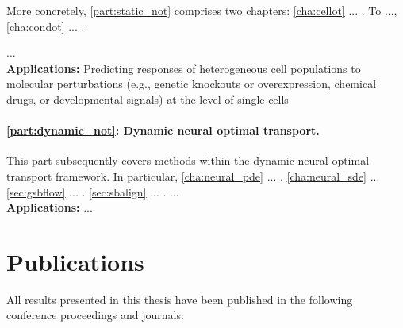 More concretely, \cref{part:static_not} comprises two chapters:
\cref{cha:cellot} ... \citep{bunne2021learning}. To ..., \cref{cha:condot} ... \citep{bunne2022supervised}.

... \\
	
\textbf{Applications:} Predicting responses of heterogeneous cell populations to molecular perturbations (e.g., genetic knockouts or overexpression, chemical drugs, or developmental signals) at the level of single cells


\paragraph{\cref{part:dynamic_not}: Dynamic neural optimal transport.}
This part subsequently covers methods within the dynamic neural optimal transport framework. In particular, \cref{cha:neural_pde} ... \citep{bunne2022proximal}.
\cref{cha:neural_sde} ...
\cref{sec:gsbflow} ... \citep{bunne2022recovering}.
\cref{sec:sbalign} ... \citep{somnath2023aligned}.
... \\

\textbf{Applications:} ...


\newpage
\section{Publications}
All results presented in this thesis have been published in the following conference proceedings and journals:

